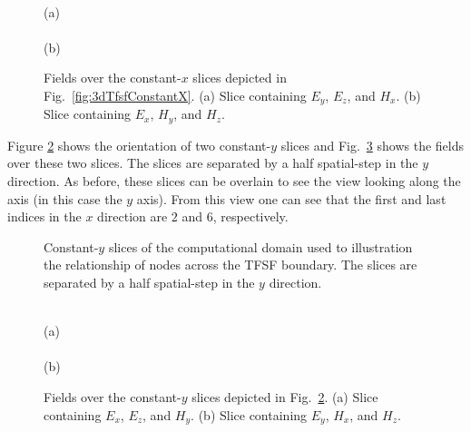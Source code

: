 \begin{figure}
  \begin{center}
  \\
  (a)\\
  \vspace{.15in}
  \\
  (b)
  \end{center} 
  \vspace{-.15in}
  \caption{Fields over the constant-$x$ slices depicted in Fig.\
  \ref{fig:3dTfsfConstantX}.  (a) Slice containing $E_y$, $E_z$, and
  $H_x$.  (b) Slice containing $E_x$, $H_y$, and $H_z$.}
  \label{fig:3dTfsfSlicesX} 
\end{figure}

Figure \ref{fig:3dTfsfConstantY} shows the orientation of two
constant-$y$ slices and Fig.\ \ref{fig:3dTfsfSlicesY} shows the fields
over these two slices.  The slices are separated by a half
spatial-step in the $y$ direction.  As before, these slices can be
overlain to see the view looking along the axis (in this case the $y$
axis).  From this view one can see that the first and last indices in
the $x$ direction are $2$ and $6$, respectively.

\begin{figure}
  \begin{center}
  \end{center} 
  \caption{Constant-$y$ slices of the computational domain used to
  illustration the relationship of nodes across the TFSF boundary.
  The slices are separated by a half spatial-step in the $y$ direction.}
  \label{fig:3dTfsfConstantY}
\end{figure}

\begin{figure}
  \begin{center}
  \\
  (a)\\
  \vspace{.15in}
  \\
  (b)
  \end{center} 
  \vspace{-.15in}
  \caption{Fields over the constant-$y$ slices depicted in Fig.\
  \ref{fig:3dTfsfConstantY}.  (a) Slice containing $E_x$, $E_z$, and
  $H_y$.  (b) Slice containing $E_y$, $H_x$, and $H_z$.}
  \label{fig:3dTfsfSlicesY} 
\end{figure}

